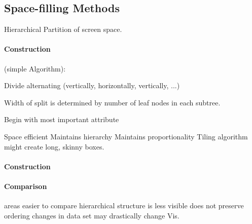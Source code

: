 \documentclass[10pt]{article} %
\begin{document}
\subsection{Space-filling Methods}
\begin{definition}
  Hierarchical Partition of screen space.
  \paragraph{Construction} (simple Algorithm): 
  \begin{cptitemize}
  \item Divide alternating (vertically, horizontally, vertically, ...)
  \item Width of split is determined by number of leaf nodes in each
    subtree.
  \item Begin with most important attribute
  \end{cptitemize}
  \begin{cptitemize}
    \advantageit Space efficient
    \advantageit Maintains hierarchy
    \advantageit Maintains proportionality
    \disadvantageit Tiling algorithm might create long, skinny boxes.
  \end{cptitemize}
\end{definition}

\begin{definition} 
  \paragraph{Construction}
  \paragraph{Comparison}
  \begin{cptitemize}
  \advantageit areas easier to compare
  \disadvantageit hierarchical structure is less visible
  \disadvantageit does not preserve ordering
  \disadvantageit changes in data set may drastically change Vis.
  \end{cptitemize}
\end{definition}
\end{document}
